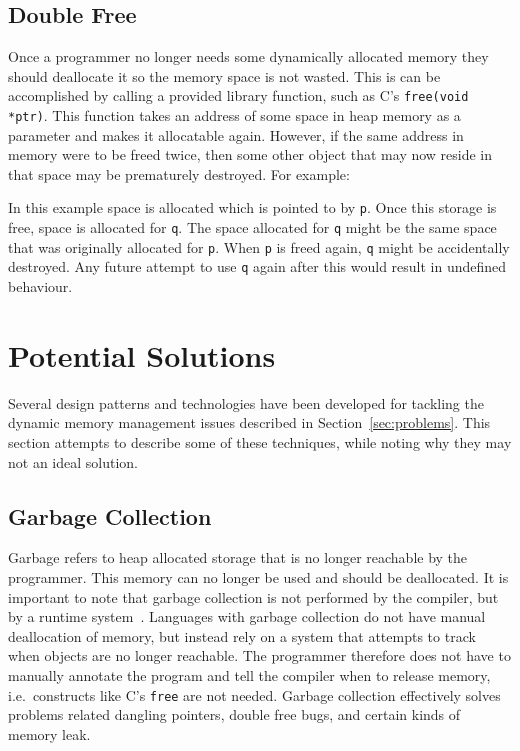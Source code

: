 \subsection{Double Free}\label{sec:doublefree}
Once a programmer no longer needs some dynamically allocated memory they should
deallocate it so the memory space is not wasted. This is can be accomplished by
calling a provided library function, such as C's \lstinline{free(void *ptr)}.
This function takes an address of some space in heap memory as a parameter and
makes it allocatable again. However, if the same address in memory were to be
freed twice, then some other object that may now reside in that space may be
prematurely destroyed. For example:



In this example space is allocated which is pointed to by \lstinline{p}. Once
this storage is free, space is allocated for \lstinline{q}. The space allocated
for \lstinline{q} might be the same space that was originally allocated for \lstinline{p}.
When \lstinline{p} is freed again, \lstinline{q} might be accidentally destroyed.
Any future attempt to use \lstinline{q} again after this would result in undefined
behaviour.

\section{Potential Solutions}
Several design patterns and technologies have been developed for tackling the
dynamic memory management issues described in Section~\ref{sec:problems}.
This section attempts to describe some of these techniques, while noting why
they may not an ideal solution.

\subsection{Garbage Collection}
Garbage refers to heap allocated storage that is no longer reachable by the
programmer. This memory can no longer be used and should be deallocated. It is
important to note that garbage collection is not performed by the compiler, but
by a runtime system~\cite{appel}. Languages with garbage collection do not have
manual deallocation of memory, but instead rely on a system that attempts to
track when objects are no longer reachable.  The programmer therefore does not
have to manually annotate the program and tell the compiler when to release
memory, i.e.\ constructs like C's \lstinline{free} are not needed. Garbage
collection effectively solves problems related dangling pointers, double free
bugs, and certain kinds of memory leak.

